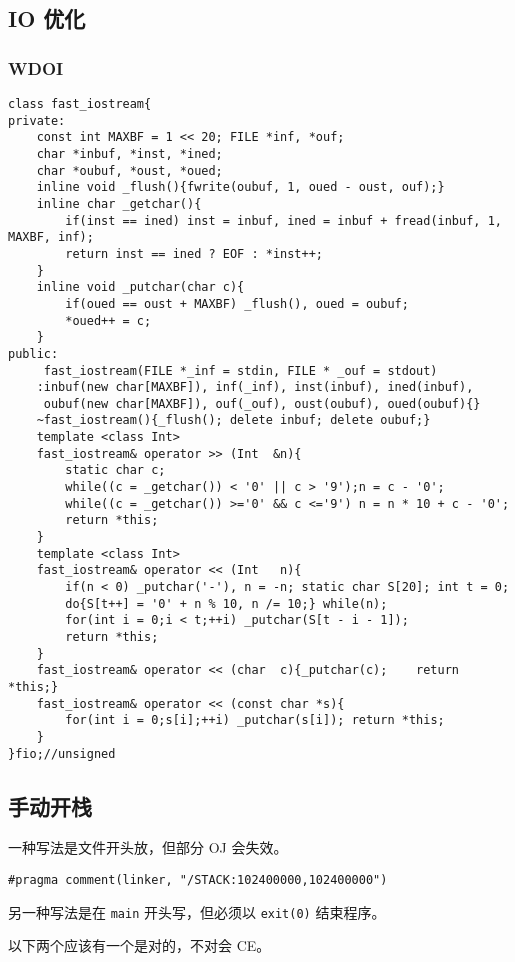 \documentclass[12pt]{ctexart}
\begin{document}
\subsection{IO 优化}

\subsubsection{WDOI}

\begin{lstlisting}
class fast_iostream{
private:
	const int MAXBF = 1 << 20; FILE *inf, *ouf;
	char *inbuf, *inst, *ined;
	char *oubuf, *oust, *oued;
	inline void _flush(){fwrite(oubuf, 1, oued - oust, ouf);}
	inline char _getchar(){
		if(inst == ined) inst = inbuf, ined = inbuf + fread(inbuf, 1, MAXBF, inf);
		return inst == ined ? EOF : *inst++;
	}
	inline void _putchar(char c){
		if(oued == oust + MAXBF) _flush(), oued = oubuf;
		*oued++ = c;
	}
public:
	 fast_iostream(FILE *_inf = stdin, FILE * _ouf = stdout)
	:inbuf(new char[MAXBF]), inf(_inf), inst(inbuf), ined(inbuf),
	 oubuf(new char[MAXBF]), ouf(_ouf), oust(oubuf), oued(oubuf){}
	~fast_iostream(){_flush(); delete inbuf; delete oubuf;}
	template <class Int>
	fast_iostream& operator >> (Int  &n){
		static char c;
		while((c = _getchar()) < '0' || c > '9');n = c - '0';
		while((c = _getchar()) >='0' && c <='9') n = n * 10 + c - '0';
		return *this;
	}
	template <class Int>
	fast_iostream& operator << (Int   n){
		if(n < 0) _putchar('-'), n = -n; static char S[20]; int t = 0;
		do{S[t++] = '0' + n % 10, n /= 10;} while(n);
		for(int i = 0;i < t;++i) _putchar(S[t - i - 1]);
		return *this;
	}
	fast_iostream& operator << (char  c){_putchar(c);    return *this;}
	fast_iostream& operator << (const char *s){
		for(int i = 0;s[i];++i) _putchar(s[i]); return *this;
	}
}fio;//unsigned
\end{lstlisting}
\subsection{手动开栈}

一种写法是文件开头放，但部分 OJ 会失效。

\begin{lstlisting}
#pragma comment(linker, "/STACK:102400000,102400000")
\end{lstlisting}

另一种写法是在 \verb|main| 开头写，但必须以 \verb|exit(0)| 结束程序。

以下两个应该有一个是对的，不对会 CE。
\end{document}
